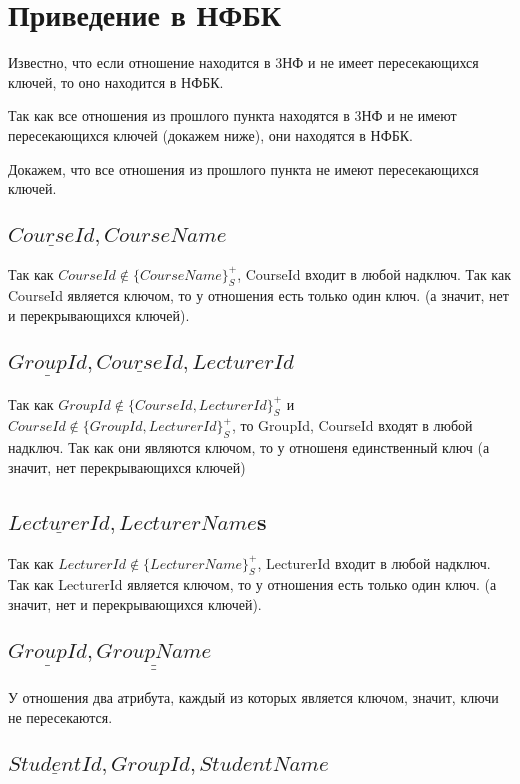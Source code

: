 \documentclass{article}
\begin{document}
	\section{Приведение в НФБК}
	
	Известно, что если отношение находится в 3НФ и не имеет пересекающихся ключей, то оно находится в НФБК.
	
	Так как все отношения из прошлого пункта находятся в 3НФ и не имеют пересекающихся ключей (докажем ниже), они находятся в НФБК.
	
	Докажем, что все отношения из прошлого пункта не имеют пересекающихся ключей.
	
	\subsection{$\underline{CourseId}, CourseName$}
	
	Так как $CourseId \not\in \{CourseName\}_S^+$, CourseId входит в любой надключ. Так как CourseId является ключом, то у отношения есть только один ключ. (а значит, нет и перекрывающихся ключей).
	
	\subsection{$\underline{GroupId}, \underline{CourseId}, LecturerId$}
	
	Так как $GroupId \not\in \{CourseId, LecturerId\}_S^+$ и $CourseId \not\in \{GroupId, LecturerId\}_S^+$, то GroupId, CourseId входят в любой надключ. Так как они являются ключом, то у отношеня единственный ключ (а значит, нет перекрывающихся ключей)
	
	\subsection{$\underline{LecturerId}, LecturerName$s}
	Так как $LecturerId \not\in \{LecturerName\}_S^+$, LecturerId входит в любой надключ. Так как LecturerId является ключом, то у отношения есть только один ключ. (а значит, нет и перекрывающихся ключей).
	
	\subsection{ $\underline{GroupId}, \underline{\underline{GroupName}}$}
	У отношения два атрибута, каждый из которых является ключом, значит, ключи не пересекаются.
	
	\subsection{ $\underline{StudentId}, GroupId, StudentName$}
	
\end{document}
